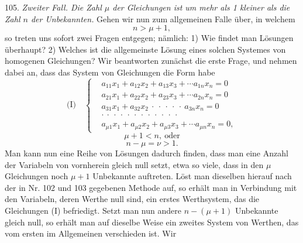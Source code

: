 \documentclass[11pt]{article}
\begin{document}
105. \textit{Zweiter Fall. Die Zahl $\mu$ der Gleichungen ist um mehr als 1 kleiner als die Zahl $n$ der Unbekannten.} Gehen wir nun zum allgemeinen Falle über, in welchem
\[ n > \mu + 1, \]
so treten uns sofort zwei Fragen entgegen; nämlich: 1) Wie findet man Lösungen überhaupt? 2) Welches ist die allgemeinste Lösung eines solchen Systemes von homogenen Gleichungen? Wir beantworten zunächst die erste Frage, und nehmen dabei an, dass das System von Gleichungen die Form habe
\[
\text{(I)}\quad
\left\{
\begin{aligned}
&a_{11}x_1+a_{12}x_2+a_{13}x_3+\cdots a_{1n}x_n=0 \\
&a_{21}x_1+a_{22}x_2+a_{23}x_3+\cdots a_{2n}x_n=0 \\
&a_{31}x_1+a_{32}x_2\ \cdot\ \cdot\ \cdot\ \cdot\ \cdot\ a_{3n}x_n=0 \\
&\cdot\ \cdot\ \cdot\ \cdot\ \cdot\ \cdot\ \cdot\ \cdot\ \cdot\ \cdot\ \cdot\ \cdot \\
&a_{\mu1}x_1+a_{\mu2}x_2+a_{\mu3}x_3+\cdots a_{\mu n}x_n=0,
\end{aligned}
\right.
\]
\[ \mu+1<n, \ \text{oder} \]
\[ n-\mu=\nu>1. \]
Man kann nun eine Reihe von Lösungen dadurch finden, dass man eine Anzahl der Variabeln von vornherein gleich null setzt, etwa so viele, dass in den $\mu$ Gleichungen noch $\mu+1$ Unbekannte auftreten. Löst man dieselben hierauf nach der in Nr. 102 und 103 gegebenen Methode auf, so erhält man in Verbindung mit den Variabeln, deren Werthe null sind, ein erstes Werthsystem, das die Gleichungen (I) befriedigt. Setzt man nun andere $n-(\mu+1)$ Unbekannte gleich null, so erhält man auf dieselbe Weise ein zweites System von Werthen, das vom ersten im Allgemeinen verschieden ist. Wir
\end{document}
